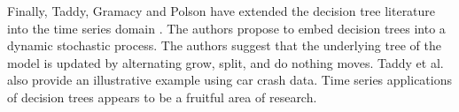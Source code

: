Finally, Taddy, Gramacy and Polson have extended the decision tree literature into the time series domain \cite{taddy2011dynamic}. The authors propose to embed decision trees into a dynamic stochastic process. The authors suggest that the underlying tree of the model is updated by alternating grow, split, and do nothing moves. Taddy et al. also provide an illustrative example using car crash data. Time series applications of decision trees appears to be a fruitful area of research. 

